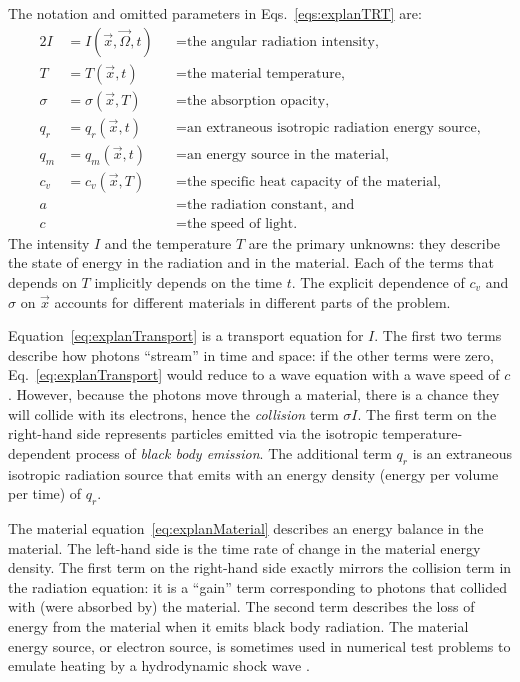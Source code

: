 The notation and omitted parameters in Eqs.~\eqref{eqs:explanTRT} are:
\begin{alignat*}{2}
  I &= I(\vec{x}, \vec{\Omega}, t) &&= \text{the angular
  radiation intensity,}
  \\
  T &= T(\vec{x}, t) &&= \text{the material temperature,}
  \\
  \sigma &= \sigma(\vec{x}, T) &&= \text{the absorption opacity,} 
  \\
  q_r &= q_r(\vec{x}, t) &&= \text{an extraneous isotropic radiation energy source,}
  \\
  q_m &= q_m(\vec{x}, t) &&= \text{an energy source in the material,}
  \\
  c_v &= c_v(\vec{x}, T) &&= \text{the specific heat capacity of the material,}
  \\
  a& &&= \text{the radiation constant, and}
  \\
  c& &&= \text{the speed of light.}
\end{alignat*}
The intensity $I$ and the temperature $T$ are the primary unknowns: they
describe the state of energy in the radiation and in the material.
Each of the terms that depends on $T$ implicitly depends on the time $t$. The
explicit dependence of $c_v$ and $\sigma$ on $\vec{x}$ accounts for different
materials in different parts of the problem.

Equation~\eqref{eq:explanTransport} is a transport equation for $I$. The first
two terms describe how photons ``stream'' in time and space: if the
other terms were zero, Eq.~\eqref{eq:explanTransport} would reduce to a
wave equation with a wave speed of $c$. However, because the photons move 
through a material, there is a chance they will collide with its electrons,
hence the \emph{collision} term $\sigma I$. The first term on the right-hand
side represents particles emitted via the isotropic temperature-dependent
process of \emph{black body emission}. The additional term $q_r$ is an extraneous
isotropic radiation source that emits with an energy density (energy per
volume per time) of $q_r$.

The material equation~\eqref{eq:explanMaterial} describes an energy balance in
the material. The left-hand side is the time rate of change in the material
energy density. The first term on the right-hand side exactly mirrors the collision term in the
radiation equation: it is a ``gain'' term corresponding to photons that
collided with (were absorbed by) the material. The second term describes the loss
of energy from the material when it emits black body radiation. The material
energy source, or electron source, is sometimes used in numerical test problems
to emulate heating by a hydrodynamic shock wave \cite{Ada2010}.

